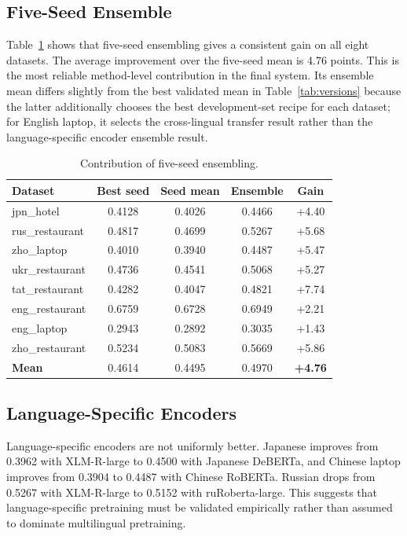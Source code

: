 \documentclass[runningheads]{llncs}
\begin{document}
\subsection{Five-Seed Ensemble}

Table~\ref{tab:ensemble} shows that five-seed ensembling gives a
consistent gain on all eight datasets. The average improvement over
the five-seed mean is 4.76 points. This is the most reliable
method-level contribution in the final system. Its ensemble mean
differs slightly from the best validated mean in
Table~\ref{tab:versions} because the latter additionally chooses the
best development-set recipe for each dataset; for English laptop, it
selects the cross-lingual transfer result rather than the
language-specific encoder ensemble result.

\begin{table}[t]
\centering
\caption{Contribution of five-seed ensembling.}
\label{tab:ensemble}
\begin{tabular}{lcccc}
\toprule
Dataset & Best seed & Seed mean & Ensemble & Gain \\
\midrule
jpn\_hotel & 0.4128 & 0.4026 & 0.4466 & +4.40 \\
rus\_restaurant & 0.4817 & 0.4699 & 0.5267 & +5.68 \\
zho\_laptop & 0.4010 & 0.3940 & 0.4487 & +5.47 \\
ukr\_restaurant & 0.4736 & 0.4541 & 0.5068 & +5.27 \\
tat\_restaurant & 0.4282 & 0.4047 & 0.4821 & +7.74 \\
eng\_restaurant & 0.6759 & 0.6728 & 0.6949 & +2.21 \\
eng\_laptop & 0.2943 & 0.2892 & 0.3035 & +1.43 \\
zho\_restaurant & 0.5234 & 0.5083 & 0.5669 & +5.86 \\
\midrule
\textbf{Mean} & 0.4614 & 0.4495 & 0.4970 & \textbf{+4.76} \\
\bottomrule
\end{tabular}
\end{table}

\subsection{Language-Specific Encoders}

Language-specific encoders are not uniformly better. Japanese improves
from 0.3962 with XLM-R-large to 0.4500 with Japanese DeBERTa, and
Chinese laptop improves from 0.3904 to 0.4487 with Chinese RoBERTa.
Russian drops from 0.5267 with XLM-R-large to 0.5152 with
ruRoberta-large. This suggests that language-specific pretraining must
be validated empirically rather than assumed to dominate multilingual
pretraining.
\end{document}
